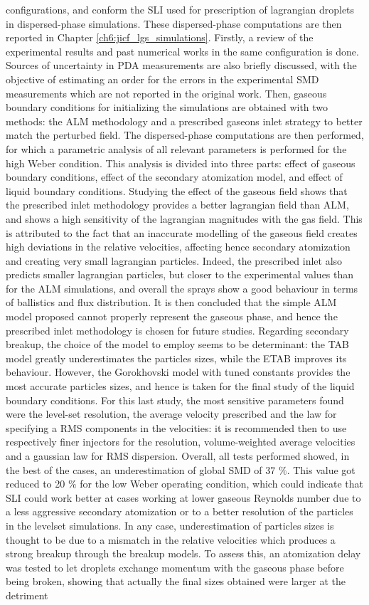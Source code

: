 configurations, and conform the SLI used for prescription of lagrangian droplets in dispersed-phase simulations. These dispersed-phase computations are then reported in Chapter \ref{ch6:jicf_lgs_simulations}. Firstly, a review of the experimental results and past numerical works in the same configuration is done. Sources of uncertainty in PDA measurements are also briefly discussed, with the objective of estimating an order for the errors in the experimental SMD measurements which are not reported in the original work. Then, gaseous boundary conditions for initializing the simulations are obtained with two methods: the ALM methodology and a prescribed gaseons inlet strategy to better match the perturbed field. The dispersed-phase computations are then performed, for which a parametric analysis of all relevant parameters is performed for the high Weber condition. This analysis is divided into three parts: effect of gaseous boundary conditions, effect of the secondary atomization model, and effect of liquid boundary conditions. Studying the effect of the gaseous field shows that the prescribed inlet methodology provides a better lagrangian field than ALM, and shows a high sensitivity of the lagrangian magnitudes with the gas field. This is attributed to the fact that an inaccurate modelling of the gaseous field creates high deviations in the relative velocities, affecting hence secondary atomization and creating very small lagrangian particles. Indeed, the prescribed inlet also predicts smaller lagrangian particles, but closer to the experimental values than for the ALM simulations, and overall the sprays show a good behaviour in terms of ballistics and flux distribution. It is then concluded that the simple ALM model proposed cannot properly represent the gaseous phase, and hence the prescribed inlet methodology is chosen for future studies. Regarding secondary breakup, the choice of the model to employ seems to be determinant: the TAB model greatly underestimates the particles sizes, while the ETAB improves its behaviour. However, the Gorokhovski model with tuned constants provides the most accurate particles sizes, and hence is taken for the final study of the liquid boundary conditions. For this last study, the most sensitive parameters found were the level-set resolution, the average velocity prescribed and the law for specifying a RMS components in the velocities: it is recommended then to use respectively finer injectors for the resolution, volume-weighted average velocities and a gaussian law for RMS dispersion. Overall, all tests performed showed, in the best of the cases, an underestimation of global SMD of 37 $\%$. This value got reduced to 20 $\%$ for the low Weber operating condition, which could indicate that SLI could work better at cases working at lower gaseous Reynolds number due to a less aggressive secondary atomization or to a better resolution of the particles in the levelset simulations. In any case, underestimation of particles sizes is thought to be due to a mismatch in the relative velocities which produces a strong breakup through the breakup models. To assess this, an atomization delay was tested to let droplets exchange momentum with the gaseous phase before being broken, showing that actually the final sizes obtained were larger at the detriment 